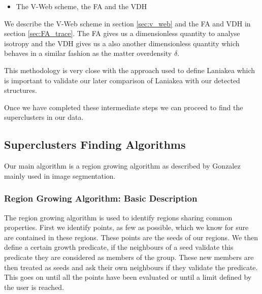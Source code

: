 \documentclass[12pt]{article}
\begin{document}
\begin{itemize}
\item The V-Web scheme, the FA and the VDH
\end{itemize}
\begin{par}
We describe the V-Web scheme in section \ref{sec:v_web}
 and the FA and VDH in section \ref{sec:FA_trace}.
The FA gives us a dimensionless quantity to analyse
 isotropy and the VDH gives us a also another
  dimensionless quantity which behaves in a similar
   fashion as the matter overdensity $\delta$.
\end{par}

\begin{par}
This methodology is very close with the approach
 used to define Laniakea
  \cite{tully_laniakea_2014} which is important to
   validate our later comparison of Laniakea with
    our detected structures. \\
\end{par}

\begin{par}
Once we have completed these intermediate steps we can
 proceed to find the superclusters in our data.
\end{par}

\subsection{Superclusters Finding Algorithms}\label{sec:algorithms}

Our main algorithm is a region growing algorithm
 as described by Gonzalez
  \cite{gonzalez_digital_2008} mainly used in
   image segmentation.
\subsubsection{Region Growing Algorithm: Basic Description}

\begin{par}
The region growing algorithm is used to identify regions sharing common properties. First we identify points, as few as possible, which we know for sure are contained in these regions. These points are the seeds of our regions. We then define a certain growth predicate, if the neighbours of a seed validate this predicate they are considered as members of the group. These new members are then treated as seeds and ask their own neighbours if they validate the predicate. This goes on until all the points have been evaluated or until a limit defined by the user is reached.
\end{par}
\end{document}

